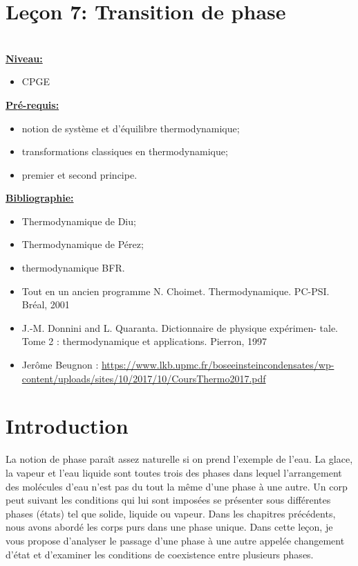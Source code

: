 \documentclass[french, a4paper, 10pt, twocolumn, landscape]{article}
\begin{document}
\clearpage

\section*{Leçon 7: Transition de phase}

\hrulefill\\

\noindent\underline{\textbf{Niveau:}}
\begin{itemize}
  \item CPGE 
\end{itemize}
\underline{\textbf{Pr{\'e}-requis: }}

\begin{itemize}
  \item notion de système et d’équilibre thermodynamique;
  \item  transformations classiques en thermodynamique;
  \item premier et second principe.
\end{itemize}
\underline{\textbf{Bibliographie:}}

\begin{itemize}
  \item Thermodynamique de Diu;
  \item Thermodynamique de Pérez;
  \item thermodynamique BFR.
  \item Tout en un ancien programme N. Choimet. Thermodynamique. PC-PSI. Bréal, 2001
  \item J.-M. Donnini and L. Quaranta. Dictionnaire de physique expérimen-
  tale. Tome 2 : thermodynamique et applications. Pierron, 1997
  \item Jerôme Beugnon : \url{https://www.lkb.upmc.fr/boseeinsteincondensates/wp-content/uploads/sites/10/2017/10/CoursThermo2017.pdf}
\end{itemize}
\hrulefill

\section*{Introduction}
La notion de phase paraît assez naturelle si on prend l’exemple de l’eau. La glace, la vapeur et l’eau liquide sont toutes trois des phases dans lequel l’arrangement des molécules d’eau n’est pas du tout la même d’une phase à une autre. Un corp peut suivant les conditions qui lui sont imposées se présenter sous différentes phases (états) tel que solide, liquide ou vapeur. Dans les chapitres précédents, nous avons abordé les corps purs dans une phase unique. Dans cette leçon, je vous propose d'analyser le passage d'une phase à une autre appelée changement d'état et d'examiner les conditions de coexistence entre plusieurs phases.
\end{document}
